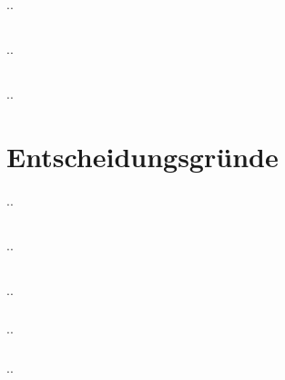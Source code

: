 ..

\subsection{}

..

\subsection{}

..

\section*{Entscheidungsgründe}
..

\subsection{}

..

\subsection{}

..

\subsubsection{}
..

\subsubsection{}
..


